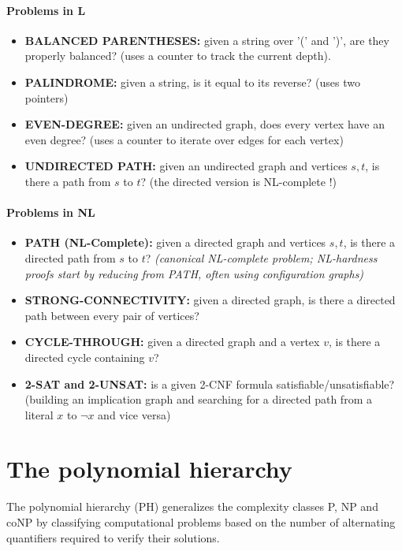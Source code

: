 \documentclass[a4paper, 11pt]{report}
\begin{document}
\paragraph{Problems in L}
\begin{itemize}
    \item \textbf{BALANCED PARENTHESES:} given a string over '(' and ')', are they properly balanced? (uses a counter to track the current depth).
    \item \textbf{PALINDROME:} given a string, is it equal to its reverse? (uses two pointers)
    \item \textbf{EVEN-DEGREE:} given an undirected graph, does every vertex have an even degree? (uses a counter to iterate over edges for each vertex)
    \item \textbf{UNDIRECTED PATH:} given an undirected graph and vertices $s, t$, is there a path from $s$ to $t$? (the directed version is NL-complete !)
\end{itemize}


\paragraph{Problems in NL}
\begin{itemize}
    \item \textbf{PATH (NL-Complete):} given a directed graph and vertices $s, t$, is there a directed path from $s$ to $t$? \textit{(canonical NL-complete problem; NL-hardness proofs start by reducing from PATH, often using configuration graphs)}
    \item \textbf{STRONG-CONNECTIVITY:} given a directed graph, is there a directed path between every pair of vertices?
    \item \textbf{CYCLE-THROUGH:} given a directed graph and a vertex $v$, is there a directed cycle containing $v$?
    \item \textbf{2-SAT and 2-UNSAT:} is a given 2-CNF formula satisfiable/unsatisfiable? (building an implication graph and searching for a directed path from a literal $x$ to $\neg x$ and vice versa)
\end{itemize}

\section{The polynomial hierarchy}
The polynomial hierarchy (PH) generalizes the complexity classes P, NP and coNP by classifying computational problems based on the number of alternating quantifiers required to verify their solutions.
\end{document}
